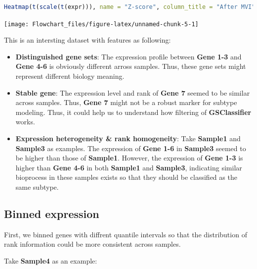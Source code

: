 \documentclass[
  12pt,
]{book}
\begin{document}
\begin{lstlisting}[language=R]
Heatmap(t(scale(t(expr))), name = "Z-score", column_title = "After MVI")
\end{lstlisting}

\begin{center}\texttt{[image: Flowchart\_files/figure-latex/unnamed-chunk-5-1]} \end{center}

This is an intersting dataset with features as following:

\begin{itemize}
\item
  \textbf{Distinguished gene sets}: The expression profile between \textbf{Gene 1-3} and \textbf{Gene 4-6} is obviously different arross samples. Thus, these gene sets might represent different biology meaning.
\item
  \textbf{Stable gene}: The expression level and rank of \textbf{Gene 7} seemed to be similar across samples. Thus, \textbf{Gene 7} might not be a robust marker for subtype modeling. Thus, it could help us to understand how filtering of \textbf{GSClassifier} works.
\item
  \textbf{Expression heterogeneity \& rank homogeneity}: Take \textbf{Sample1} and \textbf{Sample3} as examples. The expression of \textbf{Gene 1-6} in \textbf{Sample3} seemed to be higher than those of \textbf{Sample1}. However, the expression of \textbf{Gene 1-3} is higher than \textbf{Gene 4-6} in both \textbf{Sample1} and \textbf{Sample3}, indicating similar bioprocess in these samples exists so that they should be classified as the same subtype.
\end{itemize}

\hypertarget{binned-expression}{%
\subsection{Binned expression}\label{binned-expression}}

First, we binned genes with diffrent quantile intervals so that the distribution of rank information could be more consistent across samples.

Take \textbf{Sample4} as an example:
\end{document}
